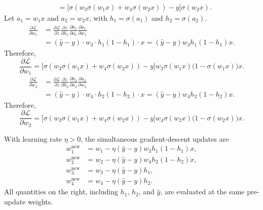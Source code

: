 \documentclass[12pt]{article}
\begin{document}
\begin{enumerate}
\begin{enumerate}[label=\textbf{\Alph*.}, leftmargin=*]
\[\begin{aligned}
               &=\boxed{\bigl[\sigma(w_3\sigma(w_1x)+w_4\sigma(w_2x))-y\bigr]
                         \sigma(w_2x)}.
       \end{aligned}
       \]
       Let $a_1=w_1x$ and $a_2=w_2x$, with
       $h_1=\sigma(a_1)$ and $h_2=\sigma(a_2)$.
       \[
       \begin{aligned}
           \frac{\partial\mathcal L}{\partial w_1}
               &=\frac{\partial\mathcal L}{\partial z}
                 \frac{\partial z}{\partial h_1}
                 \frac{\partial h_1}{\partial a_1}
                 \frac{\partial a_1}{\partial w_1} \\
               &=(\hat{y}-y)\cdot w_3\cdot h_1(1-h_1)\cdot x
                =(\hat{y}-y)w_3h_1(1-h_1)x.
       \end{aligned}
       \]
       Therefore,
       \[
           \boxed{\frac{\partial\mathcal L}{\partial w_1}
           =\bigl[\sigma(w_3\sigma(w_1x)+w_4\sigma(w_2x))-y\bigr]
             w_3\sigma(w_1x)\bigl(1-\sigma(w_1x)\bigr)x}.
       \]
       \[
       \begin{aligned}
           \frac{\partial\mathcal L}{\partial w_2}
               &=\frac{\partial\mathcal L}{\partial z}
                 \frac{\partial z}{\partial h_2}
                 \frac{\partial h_2}{\partial a_2}
                 \frac{\partial a_2}{\partial w_2} \\
               &=(\hat{y}-y)\cdot w_4\cdot h_2(1-h_2)\cdot x
                =(\hat{y}-y)w_4h_2(1-h_2)x.
       \end{aligned}
       \]
       Therefore,
       \[
           \boxed{\frac{\partial\mathcal L}{\partial w_2}
           =\bigl[\sigma(w_3\sigma(w_1x)+w_4\sigma(w_2x))-y\bigr]
             w_4\sigma(w_2x)\bigl(1-\sigma(w_2x)\bigr)x}.
       \]


       With learning rate $\eta>0$, the simultaneous gradient-descent
       updates are
       \[
       \begin{aligned}
           w_1^{\mathrm{new}}&=w_1-\eta(\hat y-y)w_3h_1(1-h_1)x, \\
           w_2^{\mathrm{new}}&=w_2-\eta(\hat y-y)w_4h_2(1-h_2)x, \\
           w_3^{\mathrm{new}}&=w_3-\eta(\hat y-y)h_1, \\
           w_4^{\mathrm{new}}&=w_4-\eta(\hat y-y)h_2.
       \end{aligned}
       \]
       All quantities on the right, including $h_1$, $h_2$, and $\hat y$,
       are evaluated at the same pre-update weights.


\end{enumerate}
\end{enumerate}
\end{document}
